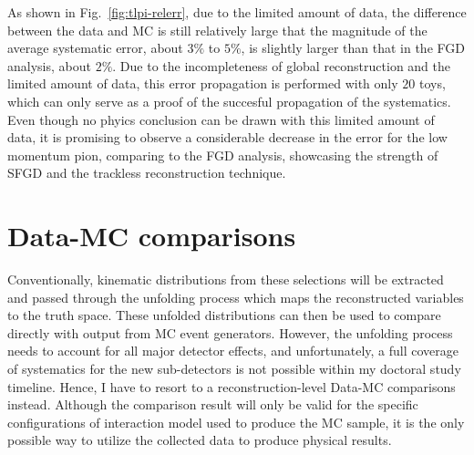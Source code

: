           As shown in Fig.~\ref{fig:tlpi-relerr}, due to the limited amount of data, the difference between the data and MC is still relatively large that the magnitude of the average systematic error, about $3\%$ to $5\%$, is slightly larger than that in the FGD analysis, about $2\%$. 
          Due to the incompleteness of global reconstruction and the limited amount of data, this error propagation is performed with only $20$ toys, which can only serve as a proof of the succesful propagation of the systematics.
          Even though no phyics conclusion can be drawn with this limited amount of data, it is promising to observe a considerable decrease in the error for the low momentum pion, comparing to the FGD analysis, showcasing the strength of SFGD and the trackless reconstruction technique.

     \section{Data-MC comparisons}
          Conventionally, kinematic distributions from these selections will be extracted and passed through the unfolding process which maps the reconstructed variables to the truth space. 
          These unfolded distributions can then be used to compare directly with output from MC event generators.
          However, the unfolding process needs to account for all major detector effects, and unfortunately, a full coverage of systematics for the new sub-detectors is not possible within my doctoral study timeline.
          Hence, I have to resort to a reconstruction-level Data-MC comparisons instead.
          Although the comparison result will only be valid for the specific configurations of interaction model used to produce the MC sample, it is the only possible way to utilize the collected data to produce physical results.
     
